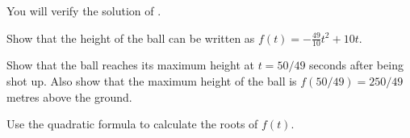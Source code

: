 \documentclass[a4paper,oneside,12pt]{article}
\begin{document}
\begin{exercise}
You will verify the solution of .
\begin{packedenum}
\item\label{subex:spring_ball_height_function}
  Show that the height of the ball can be written as
  $f(t) = -\frac{49}{10} t^2 + 10t$.

\item\label{subex:spring_ball_highest_point}
  Show that the ball reaches its maximum height at $t = 50 / 49$
  seconds after being shot up.  Also show that the maximum height of
  the ball is $f(50 / 49) = 250 / 49$ metres above the ground.

\item\label{subex:spring_ball_quadratic_formula}
  Use the quadratic formula to calculate the roots of $f(t)$.
\end{packedenum}
\end{exercise}
\end{document}
